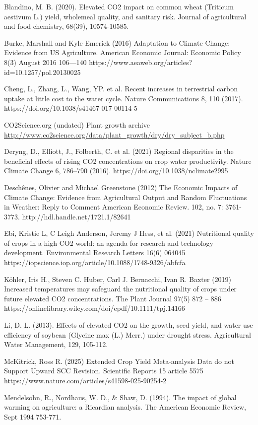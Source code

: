 \documentclass[12pt,paper=a4,DIV=12,parskip=never,chapterprefix=false,headings=standardclasses]{scrreprt}
\begin{document}
Blandino, M. B. (2020). Elevated CO2 impact on common wheat (Triticum aestivum L.) yield, wholemeal
quality, and sanitary risk. Journal of agricultural and food chemistry, 68(39), 10574-10585.

Burke, Marshall and Kyle Emerick (2016) Adaptation to Climate Change: Evidence from US Agriculture.
American Economic Journal: Economic Policy 8(3) August 2016 106—140
https://www.aeaweb.org/articles?id=10.1257/pol.20130025

Cheng, L., Zhang, L., Wang, YP. et al. Recent increases in terrestrial carbon uptake at little cost to the water
cycle. Nature Communications 8, 110 (2017). https://doi.org/10.1038/s41467-017-00114-5

CO2Science.org (undated) Plant growth archive \url{http://www.co2science.org/data/plant_growth/dry/dry_subject_b.php}

Deryng, D., Elliott, J., Folberth, C. et al. (2021) Regional disparities in the beneficial 
effects of rising
CO2 concentrations on crop water productivity. Nature Climate Change 6, 786–790 (2016).
https://doi.org/10.1038/nclimate2995

Deschênes, Olivier and Michael Greenstone (2012) The Economic Impacts of Climate Change: Evidence
from Agricultural Output and Random Fluctuations in Weather: Reply to Comment American
Economic Review. 102, no. 7: 3761-3773. http://hdl.handle.net/1721.1/82641

Ebi, Kristie L, C Leigh Anderson, Jeremy J Hess, et al. (2021) Nutritional quality of crops in a high CO2
world: an agenda for research and technology development. Environmental Research Letters 16(6)
064045 https://iopscience.iop.org/article/10.1088/1748-9326/abfcfa

Köhler, Iris H., Steven C. Huber, Carl J. Bernacchi, Ivan R. Baxter (2019) Increased temperatures may
safeguard the nutritional quality of crops under future elevated CO2 concentrations. The Plant Journal
97(5) 872 – 886 https://onlinelibrary.wiley.com/doi/epdf/10.1111/tpj.14166

Li, D. L. (2013). Effects of elevated CO2 on the growth, seed yield, and water use efficiency of soybean
(Glycine max (L.) Merr.) under drought stress. Agricultural Water Management, 129, 105-112.

McKitrick, Ross R. (2025) Extended Crop Yield Meta-analysis Data do not Support Upward SCC Revision.
Scientific Reports 15 article 5575 https://www.nature.com/articles/s41598-025-90254-2

Mendelsohn, R., Nordhaus, W. D., \& Shaw, D. (1994). The impact of global warming on agriculture: a
Ricardian analysis. The American Economic Review, Sept 1994 753-771.
\end{document}
